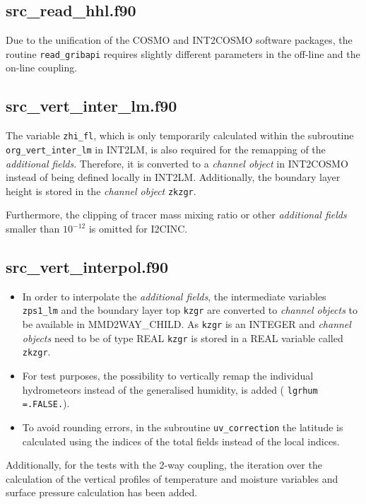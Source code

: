 \documentclass[11pt,twoside]{article}
\begin{document}
\subsection{src\_read\_hhl.f90}
Due to the unification of the COSMO and INT2COSMO software
packages, the routine \verb|read_gribapi| requires slightly different
parameters in the off-line and the on-line coupling.
\subsection{src\_vert\_inter\_lm.f90}
The variable \verb|zhi_fl|, which is only temporarily calculated within the 
subroutine \verb|org_vert_inter_lm| in INT2LM, is also
required for the remapping of the {\it additional fields}. Therefore, it is 
converted to a {\it channel object} in INT2COSMO instead of being defined 
locally in INT2LM.
Additionally, the boundary layer height is stored in the {\it channel object} 
\verb|zkzgr|.

Furthermore, the clipping of tracer mass mixing ratio or other
{\it additional fields}  smaller than $10^{-12}$ is omitted for 
I2CINC.

\subsection{src\_vert\_interpol.f90}
\begin{itemize}
\item  In order to interpolate the {\it additional fields}, the intermediate variables
\verb|zps1_lm| and the boundary layer top \verb|kzgr| are converted to
{\it channel objects} to be available in MMD2WAY\_CHILD. 
As \verb|kzgr| is an {\footnotesize INTEGER } and
{\it channel objects} need to be of type  {\footnotesize REAL} \verb|kzgr| is 
stored in a  {\footnotesize REAL} variable called \verb|zkzgr|.
\item For test purposes, the possibility to vertically
remap the individual hydrometeors instead of the generalised
humidity, is added ( \verb|lgrhum =.FALSE.|).
\item To avoid rounding errors, in the subroutine \verb|uv_correction|
the latitude is calculated using the indices of the total fields
instead of the local indices.
\end{itemize}

Additionally, for the tests with the 2-way coupling, the iteration over
the calculation of the vertical profiles of temperature and moisture
variables and surface pressure calculation has been added.
\end{document}

